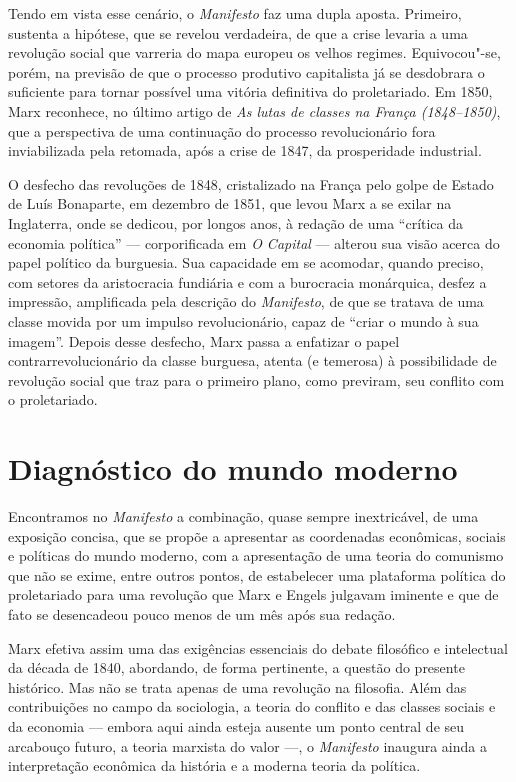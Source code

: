Tendo em vista esse cenário, o \textit{Manifesto} faz uma dupla aposta.
Primeiro, sustenta a hipótese, que se revelou verdadeira, de que a
crise levaria a uma revolução social que varreria do mapa europeu os
velhos regimes. Equivocou"-se, porém, na previsão de que o processo
produtivo capitalista já se desdobrara o suficiente para tornar
possível uma vitória definitiva do proletariado. Em 1850, Marx reconhece, no último artigo de\textit{ As lutas de classes na França 
(1848--1850)}, que a perspectiva de uma continuação do processo
revolucionário fora inviabilizada pela retomada, após a crise de 1847,
da prosperidade industrial.

O desfecho das revoluções de 1848, cristalizado na França pelo golpe de
Estado de Luís Bonaparte, em dezembro de 1851, que levou Marx a se
exilar na Inglaterra, onde se dedicou, por longos anos, à redação de
uma ``crítica da economia política'' --- corporificada em \textit{O
Capital} --- alterou sua visão acerca do papel político da burguesia.
Sua capacidade em se acomodar, quando preciso, com setores da
aristocracia fundiária e com a burocracia monárquica, desfez a
impressão, amplificada pela descrição do \textit{Manifesto}, de que se
tratava de uma classe movida por um impulso revolucionário, capaz de
``criar o mundo à sua imagem''. Depois desse desfecho, Marx passa a
enfatizar o papel contrarrevolucionário da classe burguesa, atenta (e
temerosa) à possibilidade de revolução social que traz para o primeiro
plano, como previram, seu conflito com o proletariado.

\section*{Diagnóstico do mundo moderno}

Encontramos no \textit{Manifesto} a combinação, quase sempre
inextricável, de uma exposição concisa, que se propõe a apresentar as
coordenadas econômicas, sociais e políticas do mundo moderno, com a
apresentação de uma teoria do comunismo que não se exime, entre outros
pontos, de estabelecer uma plataforma política do proletariado para uma
revolução que Marx e Engels julgavam iminente e que de fato se
desencadeou pouco menos de um mês após sua redação.

Marx efetiva assim uma das exigências essenciais do debate filosófico e
intelectual da década de 1840, abordando, de forma pertinente, a
questão do presente histórico. Mas não se trata apenas de uma revolução
na filosofia. Além das contribuições no campo da sociologia, a teoria
do conflito e das classes sociais e da economia --- embora aqui ainda
esteja ausente um ponto central de seu arcabouço futuro, a teoria
marxista do valor ---, o \textit{Manifesto} inaugura ainda a
interpretação econômica da história e a moderna teoria da política.


